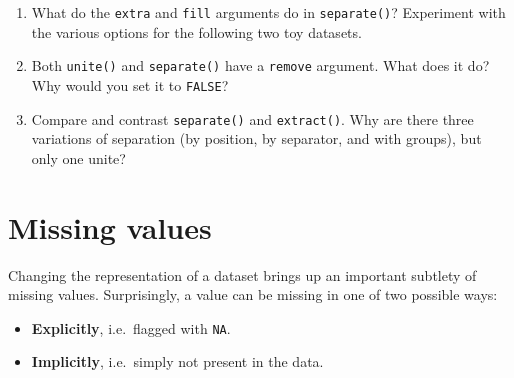 \documentclass[]{book}
\newenvironment{Shaded}{\begin{snugshade}}{\end{snugshade}}
\newcommand{\KeywordTok}[1]{\textcolor[rgb]{0.13,0.29,0.53}{\textbf{{#1}}}}
\newcommand{\DataTypeTok}[1]{\textcolor[rgb]{0.13,0.29,0.53}{{#1}}}
\newcommand{\StringTok}[1]{\textcolor[rgb]{0.31,0.60,0.02}{{#1}}}
\newcommand{\NormalTok}[1]{{#1}}
\providecommand{\tightlist}{%
  \setlength{\itemsep}{0pt}\setlength{\parskip}{0pt}}
\begin{document}
\begin{enumerate}
\def\labelenumi{\arabic{enumi}.}
\item
  What do the \texttt{extra} and \texttt{fill} arguments do in
  \texttt{separate()}? Experiment with the various options for the
  following two toy datasets.

\begin{Shaded}
\end{Shaded}
\item
  Both \texttt{unite()} and \texttt{separate()} have a \texttt{remove}
  argument. What does it do? Why would you set it to \texttt{FALSE}?
\item
  Compare and contrast \texttt{separate()} and \texttt{extract()}. Why
  are there three variations of separation (by position, by separator,
  and with groups), but only one unite?
\end{enumerate}

\section{Missing values}\label{missing-values-3}

Changing the representation of a dataset brings up an important subtlety
of missing values. Surprisingly, a value can be missing in one of two
possible ways:

\begin{itemize}
\tightlist
\item
  \textbf{Explicitly}, i.e.~flagged with \texttt{NA}.
\item
  \textbf{Implicitly}, i.e.~simply not present in the data.
\end{itemize}
\end{document}
